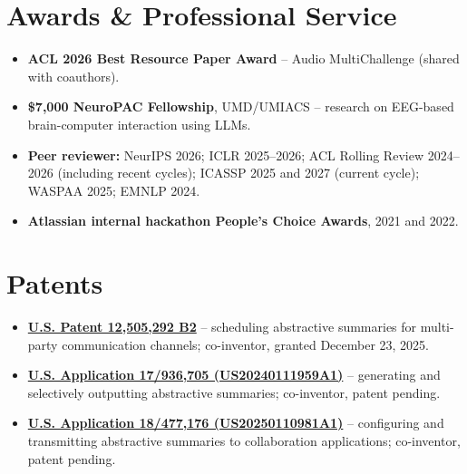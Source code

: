 \documentclass[letterpaper,11pt]{article}
\begin{document}
\section{Awards \& Professional Service}
\begin{itemize}
  \item \textbf{ACL 2026 Best Resource Paper Award} -- Audio MultiChallenge (shared with coauthors).
  \item \textbf{\$7,000 NeuroPAC Fellowship}, UMD/UMIACS -- research on EEG-based brain-computer interaction using LLMs.
  \item \textbf{Peer reviewer:} NeurIPS 2026; ICLR 2025--2026; ACL Rolling Review 2024--2026 (including recent cycles); ICASSP 2025 and 2027 (current cycle); WASPAA 2025; EMNLP 2024.
  \item \textbf{Atlassian internal hackathon People's Choice Awards}, 2021 and 2022.
\end{itemize}

\section{Patents}
\begin{itemize}
  \item \href{https://patents.google.com/patent/US12505292B2/en}{\textbf{U.S. Patent 12,505,292 B2}} -- scheduling abstractive summaries for multi-party communication channels; co-inventor, granted December 23, 2025.
  \item \href{https://patents.google.com/patent/US20240111959A1/en}{\textbf{U.S. Application 17/936,705 (US20240111959A1)}} -- generating and selectively outputting abstractive summaries; co-inventor, patent pending.
  \item \href{https://patents.google.com/patent/US20250110981A1/en}{\textbf{U.S. Application 18/477,176 (US20250110981A1)}} -- configuring and transmitting abstractive summaries to collaboration applications; co-inventor, patent pending.
\end{itemize}
\end{document}
